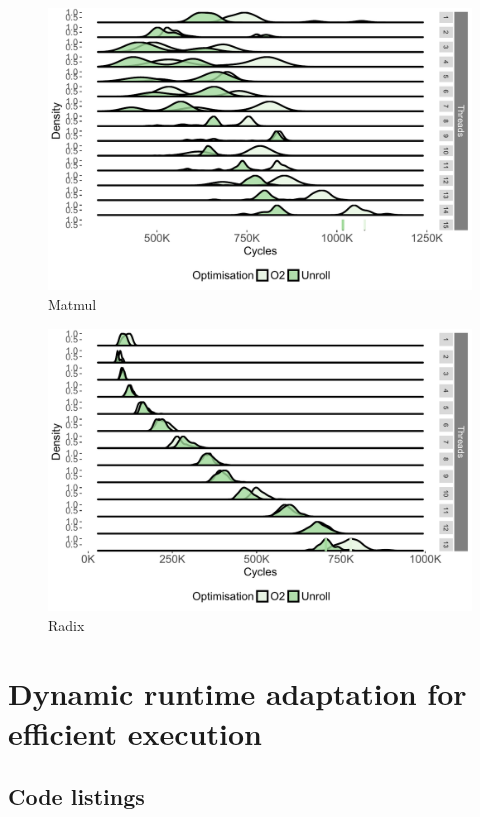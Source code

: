 \begin{appendices}
\begin{figure}[!htb]
\center
\includegraphics[width=1\textwidth]{streamit-paper/graphics/appendixgraphs/matmul-total.pdf}
\caption{Matmul}\label{chp:stream:mt}
\end{figure}

\begin{figure}[!htb]
 \includegraphics[width=1\textwidth]{streamit-paper/graphics/appendixgraphs/radix-total.pdf}
\caption{Radix}\label{chp:stream:rt}
\end{figure} 

\FloatBarrier
\chapter{Dynamic runtime adaptation for efficient execution}

\section{Code listings}


\end{appendices}
